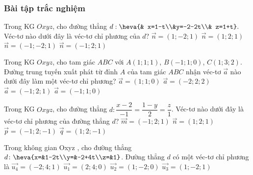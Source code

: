 	\subsubsection{Bài tập trắc nghiệm}
	\begin{ex}%
	Trong KG $Oxyz$, cho đường thẳng $d: \heva{& x=1-t\\&y=-2-2t\\& z=1+t}. $ Véc-tơ nào dưới đây là véc-tơ chỉ phương của $d$? 
	\choice
	{$\vec{n}=(1;-2;1)$}
	{$\vec{n}=(1;2;1)$}
	{\True $\vec{n}=(-1;-2;1)$}
	{$\vec{n}=(-1;2;1)$}
	\end{ex}
	\begin{ex}%
	Trong KG $Oxyz$, cho tam giác $ABC$ với $A(1;1;1)$, $B(-1;1;0)$, $C(1;3;2)$. Đường trung tuyến xuất phát từ đỉnh $A$ của tam giác $ABC$ nhận véc-tơ $\overrightarrow{a}$ nào dưới đây làm một véc-tơ chỉ phương?
	\choice
	{$\overrightarrow{a}=(1;1;0)$}
	{$\overrightarrow{a}=(-2;2;2)$}
	{$\overrightarrow{a}=(-1;2;1)$}
	{\True $\overrightarrow{a}=(-1;1;0)$}
	\end{ex}
	\begin{ex}%
	Trong KG $Oxyz$, cho đường thẳng $d:\dfrac{x-2}{-1}=\dfrac{1-y}{2}=\dfrac{z}{1}$. Véc-tơ nào dưới đây là véc-tơ chỉ phương của đường thẳng $d$?
	\choice
	{$\vec{m}=(-1;2;1)$}
	{$\vec{n}=(1;2;1)$}
	{$\vec{p}=(-1;2;-1)$}
	{\True $\vec{q}=(1;2;-1)$}
	\end{ex}
	\begin{ex}%
	Trong không gian Oxyz , cho đường thẳng $d\colon\heva{x=&1-2t\\y=&-2+4t\\z=&1}$. Đường thẳng $d$ có một véc-tơ chỉ phương là
	\choice
	{$\vec{u_4}=(-2;4;1)$}
	{$\vec{u_1}=(2;4;0)$}
	{\True $\vec{u_2}=(1;-2;0)$}
	{$\vec{u_3}=(1;-2;1)$}
	\end{ex}
